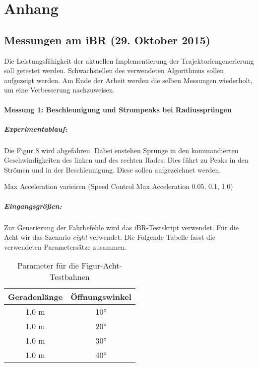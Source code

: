 %
%
\appendix
\clearpage
{}
\chapter*{Anhang}
\setcounter{chapter}{1}
\section{Messungen am iBR (29. Oktober 2015)}
\label{sec:initial-messprotokoll}

Die Leistungsfähigkeit der aktuellen Implementierung der Trajektoriengenerierung soll getestet werden. Schwachstellen des verwendeten Algorithmus sollen aufgezeigt werden. Am Ende der Arbeit werden die selben Messungen wiederholt, um eine Verbesserung nachzuweisen.

\subsubsection{Messung 1: Beschleunigung und Strompeaks bei Radiussprüngen}
\label{messung-1-beschleunigung-und-strompeaks-bei-radiussprungen}

\paragraph{Experimentablauf:}
\label{experimentablauf}

Die Figur 8 wird abgefahren. Dabei enstehen Sprünge in den kommandierten Geschwindigkeiten des linken und des rechten Rades. Dies führt zu Peaks in den Strömen und in der Beschleunigung. Diese sollen aufgezeichnet werden.

Max Acceleration varieiren (Speed Control Max Acceleration 0.05, 0.1, 1.0)

\paragraph{Eingangsgrößen:}
\label{eingangsgroen}

Zur Generierung der Fahrbefehle wird das iBR-Testskript verwendet. Für die Acht wir das Szenario \emph{eight} verwendet. Die Folgende Tabelle fasst die verwendeten Parametersätze zusammen.
\begin{table}[ht]
\caption{Parameter für die Figur-Acht-Testbahnen}
\centering
\begin{tabular}[c]{@{}cc@{}}
\toprule
Geradenlänge & Öffnungswinkel \\
\midrule
1.0 m & \ang{10} \\
1.0 m & \ang{20}\\
1.0 m & \ang{30}\\
1.0 m & \ang{40}\\
\bottomrule
\end{tabular}
\label{tab:parameters-eight-path-test}
\end{table}

